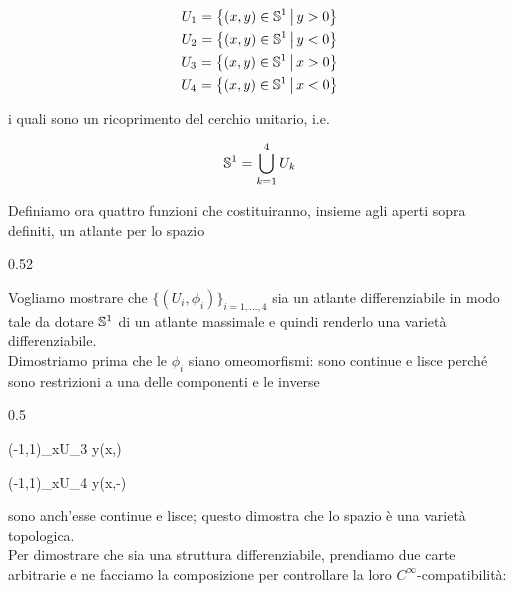 \begin{gather}
	U_{1} = \left\{ (x,y) \in \S^{1} \st y>0 \right\}\\
	U_{2} = \left\{ (x,y) \in \S^{1} \st y<0 \right\}\\
	U_{3} = \left\{ (x,y) \in \S^{1} \st x>0 \right\}\\
	U_{4} = \left\{ (x,y) \in \S^{1} \st x<0 \right\}
\end{gather}

i quali sono un ricoprimento del cerchio unitario, i.e.

\begin{equation}
	\S^{1} = \bigcup_{k=1}^{4} U_{k}
\end{equation}

Definiamo ora quattro funzioni che costituiranno, insieme agli aperti sopra definiti, un atlante per lo spazio

	{0.52}{%
		}

Vogliamo mostrare che $ \{(U_{i},\phi_{i})\}_{i=1,\dots,4} $ sia un atlante differenziabile in modo tale da dotare $ \S^{1} $ di un atlante massimale e quindi renderlo una varietà differenziabile.\\
Dimostriamo prima che le $ \phi_{i} $ siano omeomorfismi: sono continue e lisce perché sono restrizioni a una delle componenti e le inverse

	{0.5}{%
				{(-1,1)_{x}}{U_{3}}
				{y}{(x,)}
			
				{(-1,1)_{x}}{U_{4}}
				{y}{(x,-)}
			}

sono anch'esse continue e lisce; questo dimostra che lo spazio è una varietà topologica.\\
Per dimostrare che sia una struttura differenziabile, prendiamo due carte arbitrarie e ne facciamo la composizione per controllare la loro $ C^{\infty} $-compatibilità:

